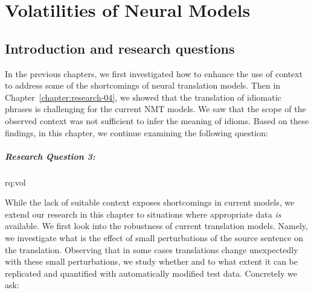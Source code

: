 
\chapter{Volatilities of Neural Models}
\label{chapter:research-05}


\section{Introduction and research questions}

In the previous chapters, we first investigated how to enhance the use of context to address some of the shortcomings of neural translation models. 
Then in Chapter~\ref{chapter:research-04}, we showed that the translation of idiomatic phrases is challenging for the current NMT models. 
We saw that the scope of the observed context was not sufficient to infer the meaning of idioms.
Based on these findings, in this chapter, we continue examining the following question:

\paragraph{Research Question 3:} \acl{rq:vol} 

\medskip

 \noindent 
 While the lack of suitable context exposes shortcomings in current models, we extend our research in this chapter to situations where appropriate data \textit{is} available. 
We first look into the robustness of current translation models.
Namely, we investigate what is the effect of small perturbations of the source sentence on the translation.
Observing that in some cases translations change unexpectedly with these small perturbations, 
we study whether and to what extent it can be replicated and quantified with automatically modified test data. 
Concretely we ask:
 
